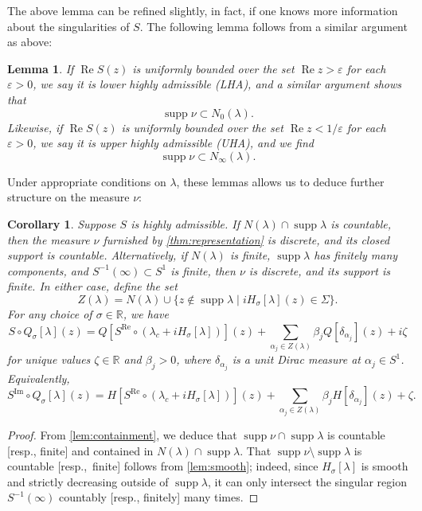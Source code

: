 \documentclass{cams-l} %
\newcommand{\RR}{\mathbb R}
\newcommand{\eps}{\varepsilon}
\newcommand{\op}{\operatorname}
\newcommand{\supp}{\operatorname{supp}}
\renewcommand{\Re}{\op{Re}}
\renewcommand{\Im}{\op{Im}}
\newtheorem{lemma}[theorem]{Lemma}
\newtheorem{corollary}[theorem]{Corollary}
\theoremstyle{definition}
\theoremstyle{remark}
\numberwithin{equation}{section}
\begin{document}
The above lemma can be refined slightly, in fact, if one knows more information about the singularities of $S$. The following lemma follows from a similar argument as above:
\begin{lemma}\label{lem:containment_refined}
    If $\Re S(z)$ is uniformly bounded over the set $\Re z> \eps$ for each $\eps>0$, we say it is \emph{lower highly admissible} (LHA), and a similar argument shows that
    \[\supp\nu\subset N_0(\lambda).\]
    Likewise, if $\Re S(z)$ is uniformly bounded over the set $\Re z < 1/\eps$ for each $\eps>0$, we say it is \emph{upper highly admissible} (UHA), and we find
    \[\supp\nu\subset N_\infty(\lambda).\]
\end{lemma}

Under appropriate conditions on $\lambda$, these lemmas allows us to deduce further structure on the measure $\nu$:

\begin{corollary}\label{cor:countable}
    Suppose $S$ is highly admissible. If $N(\lambda)\cap\supp\lambda$ is countable, then the measure $\nu$ furnished by \cref{thm:representation} is discrete, and its closed support is countable. Alternatively, if $N(\lambda)$ is finite, $\supp\lambda$ has finitely many components, and $S^{-1}(\infty)\subset S^1$ is finite, then $\nu$ is discrete, and its support is finite. In either case, define the set
    \begin{equation}\label{eq:poles}
        Z(\lambda) = N(\lambda)\cup\{z\notin\supp\lambda\;|\;iH_\sigma[\lambda](z)\in\Sigma\}.
    \end{equation}
    For any choice of $\sigma\in\RR$, we have
    \[S\circ Q_\sigma[\lambda](z) = Q[S^{\Re}\circ(\lambda_c + iH_\sigma[\lambda])](z) + \sum_{\alpha_j\in Z(\lambda)} \beta_j Q[\delta_{\alpha_j}](z) + i\zeta\]
    for unique values $\zeta\in\RR$ and $\beta_j>0$, where $\delta_{\alpha_j}$ is a unit Dirac measure at $\alpha_j\in S^1$. Equivalently,
    \[S^{\Im}\circ Q_\sigma[\lambda](z) = H[S^{\Re}\circ(\lambda_c + iH_\sigma[\lambda])](z) + \sum_{\alpha_j\in Z(\lambda)} \beta_j H[\delta_{\alpha_j}](z) + \zeta.\]
\end{corollary}
\begin{proof}
    From \cref{lem:containment}, we deduce that $\supp\nu\cap \supp\lambda$ is countable [resp., finite] and contained in $N(\lambda)\cap\supp\lambda$. That $\supp\nu\setminus\supp\lambda$ is countable [resp.,~finite] follows from \cref{lem:smooth}; indeed, since $H_\sigma[\lambda]$ is smooth and strictly decreasing outside of $\supp\lambda$, it can only intersect the singular region $S^{-1}(\infty)$ countably [resp., finitely] many times.
\end{proof}
\end{document}
